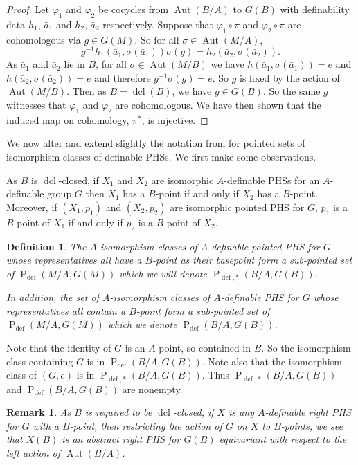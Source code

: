 \documentclass{article}
\theoremstyle{problemstyle}
\newtheorem{definition}[problem]{Definition}
\newtheorem{remark}[problem]{Remark}
\DeclareMathOperator{\defin}{def} %
\DeclareMathOperator{\aut}{Aut} %
\DeclareMathOperator{\PP}{P} %
\DeclareMathOperator{\dcl}{dcl} %
\begin{document}
\begin{proof}
Let $\varphi_1$ and $\varphi_2$ be cocycles from $\aut(B/A)$ to $G(B)$ with definability data $h_1$, $\bar{a}_1$ and $h_2$, $\bar{a}_2$ respectively. Suppose that $\varphi_1 \circ \pi$ and $\varphi_2\circ\pi$ are cohomologous via $g \in G(M)$. So for all $\sigma \in \aut(M/A)$, $$g^{-1}h_1(\bar{a}_1,\sigma(\bar{a}_1))\sigma(g) = h_2(\bar{a}_2,\sigma(\bar{a}_2)).$$ As $\bar{a}_1$ and $\bar{a}_2$ lie in $B$, for all $\sigma \in \aut(M/B)$ we have $h(\bar{a}_1,\sigma(\bar{a}_1)) = e$ and $h(\bar{a}_2,\sigma(\bar{a}_2)) = e$  and therefore $g^{-1}\sigma(g) = e$. So $g$ is fixed by the action of $\aut(M/B)$. Then as $B = \dcl(B)$, we have $g \in G(B)$. So the same $g$ witnesses that $\varphi_1$ and $\varphi_2$ are cohomologous. We have then shown that the induced map on cohomology, $\pi^*$, is injective.
\end{proof}

We now alter and extend slightly the notation from \cite{pillay_1997} for pointed sets of isomorphism classes of definable PHSs. We first make some observations. 

As $B$ is $\dcl$-closed, if $X_1$ and $X_2$ are isomorphic $A$-definable PHSs for an $A$-definable group $G$ then $X_1$ has a $B$-point if and only if $X_2$ has a $B$-point. Moreover, if $(X_1,p_1)$ and $(X_2,p_2)$ are isomorphic pointed PHS for $G$, $p_1$ is a $B$-point of $X_1$ if and only if $p_2$ is a $B$-point of $X_2$.

\begin{definition}
    The $A$-isomorphism classes of $A$-definable pointed PHS for $G$ whose representatives all have a $B$-point as their basepoint form a sub-pointed set of $\PP_{\defin}(M/A,G(M))$ which we will denote $\PP_{\defin,*}(B/A,G(B))$. 
    
    In addition, the set of $A$-isomorphism classes of $A$-definable PHS for $G$ whose representatives all contain a $B$-point form a sub-pointed set of $\PP_{\defin}(M/A,G(M))$ which we denote $\PP_{\defin}(B/A,G(B))$. 
\end{definition}

Note that the identity of $G$ is an $A$-point, so contained in $B$. So the isomorphism class containing $G$ is in $\PP_{\defin}(B/A,G(B))$. Note also that the isomorphism class of $(G,e)$ is in $\PP_{\defin,*}(B/A,G(B))$. Thus $\PP_{\defin,*}(B/A,G(B))$ and $\PP_{\defin}(B/A,G(B))$ are nonempty.


\begin{remark}\label{Bpts of PHS}
    As $B$ is required to be $\dcl$-closed, if $X$ is any $A$-definable right PHS for $G$ with a $B$-point, then restricting the action of $G$ on $X$ to $B$-points, we see that $X(B)$ is an abstract right PHS for $G(B)$ equivariant with respect to the left action of $\aut(B/A)$.
\end{remark}
\end{document}
